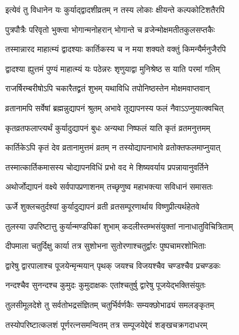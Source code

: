 \twolineshloka
{इत्येवं तु विधानेन यः कुर्याद्द्वादशीव्रतम्}
{न तस्य लोकाः क्षीयन्ते कल्पकोटिशतैरपि} %

\twolineshloka
{पुत्रपौत्रैः परिवृतो भुक्त्वा भोगान्मनोहरान्}
{भोगान्ते च व्रजेन्मोक्षमतीतकुलसप्तकैः} %

\twolineshloka
{तस्मान्नारद माहात्म्यं द्वादश्याः कार्तिकस्य च}
{न मया शक्यते वक्तुं किमन्यैर्मनुजैरपि} %

\twolineshloka
{द्वादश्या ह्युत्तमं पुण्यं माहात्म्यं यः पठेन्नरः}
{शृणुयाद्वा मुनिश्रेष्ठ स याति परमां गतिम्} %

\twolineshloka
{राजर्षिरम्बरीषोऽपि चकारैतद्व्रतं शुभम्}
{यथाविधि तपोनिष्ठस्तेन मोक्षमवाप्तवान्} %





\twolineshloka
{व्रतानामपि सर्वेषां ब्रह्मन्नुद्यापनं श्रुतम्}
{अभावे तूद्यापनस्य फलं नैवाऽऽप्नुयात्क्वचित्} %

\twolineshloka
{कृतव्रतफलाप्त्यर्थं कुर्यादुद्यापनं बुधः}
{अन्यथा निष्फलं याति कृतं व्रतमनुत्तमम्} %

\twolineshloka
{कार्तिकेऽपि कृतं देव व्रतानामुत्तमं व्रतम्}
{न तस्योद्यापनाभावे व्रतोक्तफलमाप्नुयात्} %

\twolineshloka
{तस्मात्कार्तिकमासस्य चोद्यापनविधिं प्रभो}
{वद मे शिष्यवर्याय प्रपन्नायानुवर्तिने} %


\twolineshloka
{अथोर्जोद्यापनं वक्ष्ये सर्वपापप्रणाशनम्}
{तच्छृणुष्व महाभक्त्या सविधानं समासतः} %

\twolineshloka
{ऊर्जे शुक्लचतुर्दश्यां कुर्यादुद्यापनं व्रती}
{व्रतसम्पूरणार्थाय विष्णुप्रीत्यर्थहेतवे} %

\twolineshloka
{तुलस्या उपरिष्टात्तु कुर्यान्मण्डपिकां शुभाम्}
{कदलीस्तम्भसंयुक्तां नानाधातुविचित्रिताम्} %

\twolineshloka
{दीपमाला चतुर्दिक्षु कार्या तत्र सुशोभना}
{सुतोरणाश्चतुर्द्वारः पुष्पचामरशोभिताः} %

\twolineshloka
{द्वारेषु द्वारपालाश्च पूजयेन्मृन्मयान् पृथक्}
{जयश्च विजयश्चैव चण्डश्चैव प्रचण्डकः} %

\twolineshloka
{नन्दश्चैव सुनन्दश्च कुमुदः कुमुदाक्षकः}
{एतांश्चतुर्षु द्वारेषु पूजयेद्भक्तिसंयुतः} %

\twolineshloka
{तुलसीमूलदेशे तु सर्वतोभद्रसंज्ञितम्}
{चतुर्भिर्वर्णकैः सम्यक्छोभाढ्यं समलङ्कृतम्} %

\twolineshloka
{तस्योपरिष्टात्कलशं पूर्णरत्नसमन्वितम्}
{तत्र सम्पूजयेद्देवं शङ्खचक्रगदाधरम्} %

